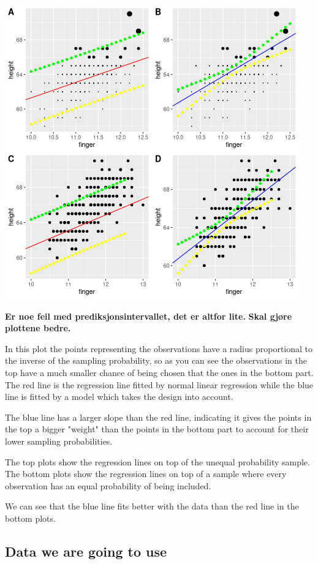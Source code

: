 \documentclass{article}
\begin{document}
\begin{example}
\includegraphics[scale = 0.5]{example1.png}

\textbf{Er noe feil med prediksjonsintervallet, det er altfor lite.}
\textbf{Skal gjøre plottene bedre.}


In this plot the points representing the observations have a radius proportional to the inverse of the sampling probability, so as you can see the observations in the top have a much smaller chance of being chosen that the ones in the bottom part. The red line is the regression line fitted by normal linear regression while the blue line is fitted by a model which takes the design into account. 

The blue line has a larger slope than the red line, indicating it gives the points in the top a bigger "weight" than the points in the bottom part to account for their lower sampling probabilities.

The top plots show the regression lines on top of the unequal probability sample.
The bottom plots show the regression lines on top of a sample where every
observation has an equal probability of being included.

We can see that the blue line fits better with the data than the red line in the
bottom plots.

\end{example}

\subsection{Data we are going to use}
\end{document}
